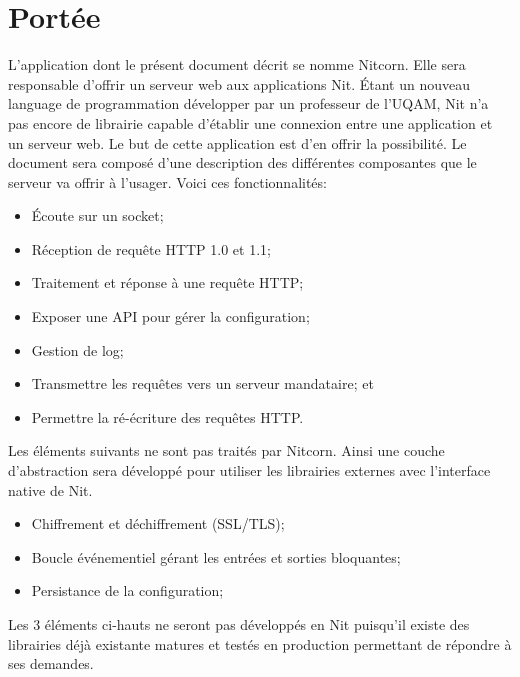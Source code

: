 \documentclass{scrreprt}
\begin{document}
\section{Portée}
L'application dont le présent document décrit se nomme Nitcorn. Elle sera responsable d'offrir un serveur web aux applications Nit. Étant un nouveau language de programmation développer par un professeur de l'UQAM, Nit n'a pas encore de librairie capable d'établir une connexion entre une application et un serveur web. Le but de cette application est d'en offrir la possibilité. Le document sera composé d'une description des différentes composantes que le serveur va offrir à l'usager. Voici ces fonctionnalités:
\begin{itemize}
    \item Écoute sur un socket;
    \item Réception de requête HTTP 1.0 et 1.1;
    \item Traitement et réponse à une requête HTTP;
    \item Exposer une API pour gérer la configuration;
    \item Gestion de log;
    \item Transmettre les requêtes vers un serveur mandataire; et
    \item Permettre la ré-écriture des requêtes HTTP.
\end{itemize}
Les éléments suivants ne sont pas traités par Nitcorn. Ainsi une couche
d'abstraction sera développé pour utiliser les librairies externes avec l'interface native de
Nit. 
\begin{itemize}
    \item Chiffrement et déchiffrement (SSL/TLS);
    \item Boucle événementiel gérant les entrées et sorties bloquantes; 
    \item Persistance de la configuration;
\end{itemize}

Les 3 éléments ci-hauts ne seront pas développés en Nit puisqu'il existe des
librairies déjà existante matures et testés en production permettant de répondre à ses demandes.
\end{document}
